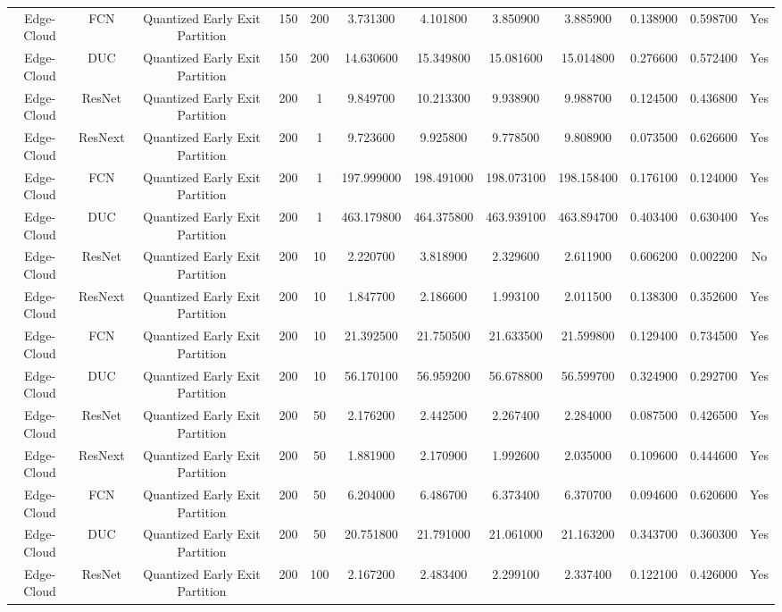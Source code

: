 \begin{tabular}{|c||c||c||c||c||c||c||c||c||c||c||c|}
Edge-Cloud & FCN & Quantized Early Exit Partition & 150 & 200 & 3.731300 & 4.101800 & 3.850900 & 3.885900 & 0.138900 & 0.598700 & Yes \\
Edge-Cloud & DUC & Quantized Early Exit Partition & 150 & 200 & 14.630600 & 15.349800 & 15.081600 & 15.014800 & 0.276600 & 0.572400 & Yes \\
Edge-Cloud & ResNet & Quantized Early Exit Partition & 200 & 1 & 9.849700 & 10.213300 & 9.938900 & 9.988700 & 0.124500 & 0.436800 & Yes \\
Edge-Cloud & ResNext & Quantized Early Exit Partition & 200 & 1 & 9.723600 & 9.925800 & 9.778500 & 9.808900 & 0.073500 & 0.626600 & Yes \\
Edge-Cloud & FCN & Quantized Early Exit Partition & 200 & 1 & 197.999000 & 198.491000 & 198.073100 & 198.158400 & 0.176100 & 0.124000 & Yes \\
Edge-Cloud & DUC & Quantized Early Exit Partition & 200 & 1 & 463.179800 & 464.375800 & 463.939100 & 463.894700 & 0.403400 & 0.630400 & Yes \\
Edge-Cloud & ResNet & Quantized Early Exit Partition & 200 & 10 & 2.220700 & 3.818900 & 2.329600 & 2.611900 & 0.606200 & 0.002200 & No \\
Edge-Cloud & ResNext & Quantized Early Exit Partition & 200 & 10 & 1.847700 & 2.186600 & 1.993100 & 2.011500 & 0.138300 & 0.352600 & Yes \\
Edge-Cloud & FCN & Quantized Early Exit Partition & 200 & 10 & 21.392500 & 21.750500 & 21.633500 & 21.599800 & 0.129400 & 0.734500 & Yes \\
Edge-Cloud & DUC & Quantized Early Exit Partition & 200 & 10 & 56.170100 & 56.959200 & 56.678800 & 56.599700 & 0.324900 & 0.292700 & Yes \\
Edge-Cloud & ResNet & Quantized Early Exit Partition & 200 & 50 & 2.176200 & 2.442500 & 2.267400 & 2.284000 & 0.087500 & 0.426500 & Yes \\
Edge-Cloud & ResNext & Quantized Early Exit Partition & 200 & 50 & 1.881900 & 2.170900 & 1.992600 & 2.035000 & 0.109600 & 0.444600 & Yes \\
Edge-Cloud & FCN & Quantized Early Exit Partition & 200 & 50 & 6.204000 & 6.486700 & 6.373400 & 6.370700 & 0.094600 & 0.620600 & Yes \\
Edge-Cloud & DUC & Quantized Early Exit Partition & 200 & 50 & 20.751800 & 21.791000 & 21.061000 & 21.163200 & 0.343700 & 0.360300 & Yes \\
Edge-Cloud & ResNet & Quantized Early Exit Partition & 200 & 100 & 2.167200 & 2.483400 & 2.299100 & 2.337400 & 0.122100 & 0.426000 & Yes \\

\end{tabular}
